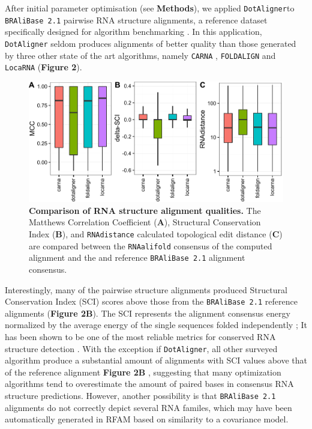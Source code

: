 \documentclass[a4paper,11pt]{article}
\newcommand\dotaligner{\texttt{DotAligner}}
\newcommand\bralibase{\texttt{BRAliBase 2.1}}
\newcommand\locarna{\texttt{LocaRNA}}
\newcommand\foldalign{\texttt{FOLDALIGN}}
\newcommand\carna{\texttt{CARNA}}
\newcommand\rnaalifold{\texttt{RNAalifold}}
\begin{document}
After initial parameter optimisation (see \textbf{Methods}), we applied 
\dotaligner  to  \bralibase{} pairwise RNA structure alignments, a reference 
dataset specifically designed for algorithm benchmarking 
\cite{Gardner15860779,wilm2006enhanced}. In this application, \dotaligner{} seldom 
produces alignments of better quality than those generated by three other 
state of the art algorithms, namely \carna{} \cite{Sorescu2012}, \foldalign{} 
\cite{havgaard2007fast,sundfeld2015foldalign} and \locarna{} \cite{Will17432929}
(\textbf{Figure 2}).\\

\begin{figure}
 \includegraphics[width=\textwidth]{fig2}
 \caption {\textbf{Comparison of RNA structure alignment qualities.}  The Matthews Correlation Coefficient (\textbf{A}), Structural Conservation Index  (\textbf{B}), and \texttt{RNAdistance} calculated topological edit distance (\textbf{C}) are compared between the \rnaalifold{} consensus of the computed alignment 
 and the and reference \bralibase{} alignment consensus.  }
\end{figure}

Interestingly, many of the pairwise structure alignments produced Structural 
Conservation Index (SCI) scores above those from the \bralibase{} reference alignments (\textbf{Figure 2B}). 
The SCI represents the alignment consensus energy normalized by the average energy 
of the single sequences folded independently \cite{washietl2005fast}; 
It has been shown to be one of the most reliable metrics for conserved RNA structure 
detection \cite{gruber2008strategies}. With the exception if \dotaligner{}, all other 
surveyed algorithm produce a substantial amount of alignments with SCI values 
above that of the reference  alignment \textbf{Figure 2B }, suggesting that many optimization 
algorithms tend to overestimate the amount of paired bases in consensus RNA structure predictions. 
However, another possibility is that \bralibase{} alignments do not correctly depict several RNA familes, 
which may have been automatically generated in RFAM based on similarity to a covariance model.\\
\end{document}

